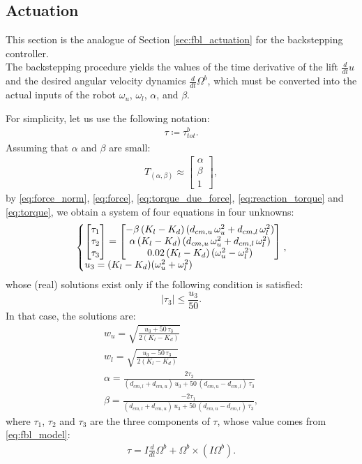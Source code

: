 \subsection{Actuation}
This section is the analogue of Section \ref{sec:fbl_actuation} for the backstepping controller. 
\\The backstepping procedure yields the values of the time derivative of the lift $\frac{d}{dt} u$ and the desired angular velocity dynamics $\frac{d}{dt}\Omega^b$, which must be converted into the actual inputs of the robot $\omega_u$, $\omega_l$, $\alpha$, and $\beta$.

For simplicity, let us use the following notation:
\begin{align*}
    \tau \coloneq \tau_{tot}^b.
\end{align*}
Assuming that $\alpha$ and $\beta$ are small:
\begin{align*}
    T_{(\alpha,\beta)}\approx \begin{bmatrix}
        \alpha\\\beta\\1
    \end{bmatrix},
\end{align*}
by \ref{eq:force_norm}, \ref{eq:force}, \ref{eq:torque_due_force}, \ref{eq:reaction_torque} and \ref{eq:torque}, we obtain a system of four equations in four unknowns:
\begin{equation*}
    \left\{\begin{array}{@{}l@{}}
\begin{bmatrix}
    \tau_1\\\tau_2\\\tau_3\\
\end{bmatrix}=\begin{bmatrix}
    -\beta \, (K_l-K_d) \, (d_{cm,u} \, \omega_u^2+d_{cm,l} \, \omega_l^2)\\
    \alpha \, (K_l-K_d) \, (d_{cm,u} \, \omega_u^2+d_{cm,l} \, \omega_l^2)\\
    0.02 \, (K_l-K_d) \, (\omega_u^2-\omega_l^2)
\end{bmatrix} \\
u_3=(K_l-K_d)(\omega_u^2+\omega_l^2)

\end{array}\right. ,
     \end{equation*}
whose (real) solutions exist only if the following condition is satisfied:
$$|\tau_3| \leq \frac{u_3}{50}.$$
In that case, the solutions are:
\begin{gather*}
    w_u=\sqrt{\frac{u_3+50 \, \tau_3}{2(K_l-K_d)}}\\
    w_l=\sqrt{\frac{u_3-50 \, \tau_3}{2(K_l-K_d)}}\\
    \alpha=\frac{2\tau_2}{(d_{cm,l}+d_{cm,u}) \, u_3+50 \, (d_{cm,u}-d_{cm,l}) \, \tau_3}\\
    \beta=\frac{-2\tau_1}{(d_{cm,l}+d_{cm,u}) \, u_3+50 \, (d_{cm,u}-d_{cm,l}) \, \tau_3},
\end{gather*}
where $\tau_1$, $\tau_2$ and $\tau_3$ are the three components of $\tau$, whose value comes from \ref{eq:fbl_model}:
\begin{align*}
    \tau=I\frac{d}{dt}\Omega^b + \Omega^b \times (I\Omega^b).
\end{align*}